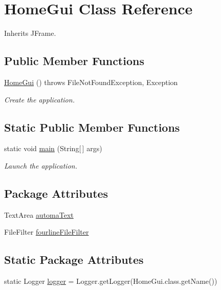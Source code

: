 \hypertarget{class_home_gui}{\section{Home\-Gui Class Reference}
\label{class_home_gui}
}


Inherits J\-Frame.

\subsection*{Public Member Functions}
\begin{DoxyCompactItemize}
\item 
\hyperlink{class_home_gui_add92e1cf71983b9cc6f70f040d3ea593}{Home\-Gui} ()  throws File\-Not\-Found\-Exception, Exception 
\begin{DoxyCompactList}\small\item\em Create the application. \end{DoxyCompactList}\end{DoxyCompactItemize}
\subsection*{Static Public Member Functions}
\begin{DoxyCompactItemize}
\item 
static void \hyperlink{class_home_gui_a241867731938068ae82ae7d5e7371fa3}{main} (String\mbox{[}$\,$\mbox{]} args)
\begin{DoxyCompactList}\small\item\em Launch the application. \end{DoxyCompactList}\end{DoxyCompactItemize}
\subsection*{Package Attributes}
\begin{DoxyCompactItemize}
\item 
Text\-Area \hyperlink{class_home_gui_a6b00edbcb893105ddc5e3b2beb4c2dca}{automa\-Text}
\item 
File\-Filter \hyperlink{class_home_gui_a7f56e390a2982689b92cee117f50e987}{fourline\-File\-Filter}
\end{DoxyCompactItemize}
\subsection*{Static Package Attributes}
\begin{DoxyCompactItemize}
\item 
static Logger \hyperlink{class_home_gui_a6eef831dc2ff4533740f3395c4b9067a}{logger} = Logger.\-get\-Logger(Home\-Gui.\-class.\-get\-Name())
\end{DoxyCompactItemize}
